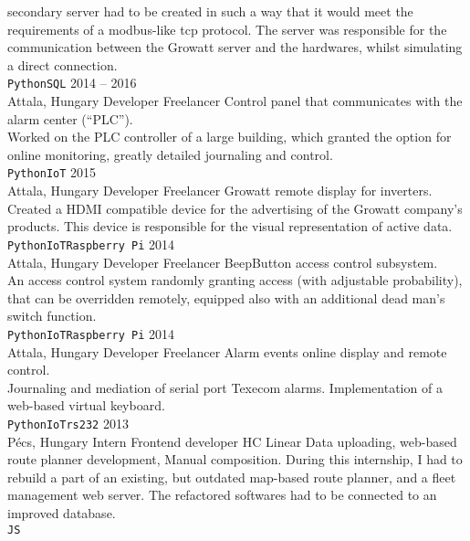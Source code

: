 \documentclass[9pt]{developercv} %
\begin{document}
\begin{entrylist}
{			secondary server had to be created in such a way that it would meet the requirements of a modbus-like tcp protocol.
			The server was responsible for the communication between the Growatt server and the hardwares, whilst simulating a
			direct connection.
			\\ \texttt{Python}\slashsep\texttt{SQL}}
	\entry
		{2014 -- 2016 \\ Attala, Hungary}
		{Developer}
		{Freelancer}
		{Control panel that communicates with the alarm center (“PLC”). \\
			Worked on the PLC controller of a large building, which granted the option for online monitoring, greatly detailed
			journaling and control.
			\\ \texttt{Python}\slashsep\texttt{IoT}}
	\entry
		{2015 \\ Attala, Hungary}
		{Developer}
		{Freelancer}
		{Growatt remote display for inverters. \\
			Created a HDMI compatible device for the advertising of the Growatt company’s products. This device is responsible
			for the visual representation of active data.
			\\ \texttt{Python}\slashsep\texttt{IoT}\slashsep\texttt{Raspberry Pi}}
	\entry
		{2014 \\ Attala, Hungary}
		{Developer}
		{Freelancer}
		{BeepButton access control subsystem. \\
			An access control system randomly granting access (with adjustable probability), that can be overridden remotely,
			equipped also with an additional dead man’s switch function.
			\\ \texttt{Python}\slashsep\texttt{IoT}\slashsep\texttt{Raspberry Pi}}
	\entry
		{2014 \\ Attala, Hungary}
		{Developer}
		{Freelancer}
		{Alarm events online display and remote control.\\
			Journaling and mediation of serial port Texecom alarms. Implementation of a web-based virtual keyboard.
			\\ \texttt{Python}\slashsep\texttt{IoT}\slashsep\texttt{rs232}}
	\entry
		{2013 \\ Pécs, Hungary}
		{Intern \slashsep Frontend developer}
		{HC Linear}
		{Data uploading, web-based route planner development, Manual composition. During this internship, I had to rebuild a
			part of an existing, but outdated map-based route planner, and a fleet management web server. The refactored
			softwares had to be connected to an improved database.
			\\ \texttt{JS}}
\end{entrylist}
\end{document}
